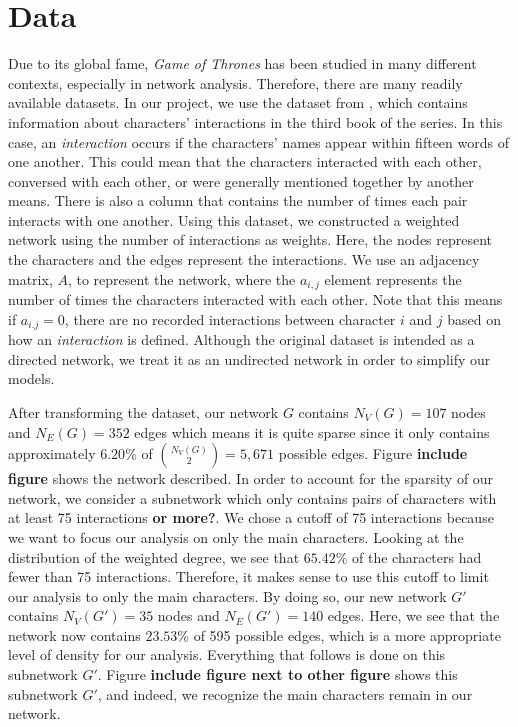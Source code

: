 \documentclass{article}
\begin{document}
\section{Data}\label{Data}
Due to its global fame, \textit{Game of Thrones} has been studied in many different contexts, especially in network analysis. Therefore, there are many readily available datasets. In our project, we use the dataset from \cite{beveridge2016network}, which contains information about characters' interactions in the third book of the series. In this case, an \textit{interaction} occurs if the characters' names appear within fifteen words of one another. This could mean that the characters interacted with each other, conversed with each other, or were generally mentioned together by another means. There is also a column that contains the number of times each pair interacts with one another. Using this dataset, we constructed a weighted network using the number of interactions as weights. Here, the nodes represent the characters and the edges represent the interactions. We use an adjacency matrix, $A$, to represent the network, where the $a_{i,j}$ element represents the number of times the characters interacted with each other. Note that this means if $a_{i.j} = 0$, there are no recorded interactions between character $i$ and $j$ based on how an \textit{interaction} is defined. Although the original dataset is intended as a directed network, we treat it as an undirected network in order to simplify our models.

After transforming the dataset, our network $G$ contains $N_V(G) = 107$ nodes and $N_E(G) = 352$ edges which means it is quite sparse since it only contains approximately $6.20\%$ of ${N_V(G) \choose 2} = 5,671$ possible edges. Figure \textbf{include figure} shows the network described. In order to account for the sparsity of our network, we consider a subnetwork which only contains pairs of characters with at least 75 interactions \textbf{or more?}. We chose a cutoff of 75 interactions because we want to focus our analysis on only the main characters. Looking at the distribution of the weighted degree, we see that $65.42\%$ of the characters had fewer than 75 interactions. Therefore, it makes sense to use this cutoff to limit our analysis to only the main characters. By doing so, our new network $G'$ contains $N_V(G') = 35$ nodes and $N_E(G') = 140$ edges. Here, we see that the network now contains $23.53\%$ of 595 possible edges, which is a more appropriate level of density for our analysis. Everything that follows is done on this subnetwork $G'$. Figure \textbf{include figure next to other figure} shows this subnetwork $G'$, and indeed, we recognize the main characters remain in our network.
\end{document}
